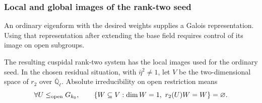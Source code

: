 \subsubsection{Local and global images of the rank-two seed}

An ordinary eigenform with the desired weights supplies a Galois representation. Using that representation after extending the base field requires control of its image on open subgroups.

\begin{proposition}\label{prop:mixed-hilbert-restriction}
The resulting cuspidal rank-two system has the local images used
for the ordinary seed. In the chosen residual situation, with
\(\bar\eta^2\ne1\), let \(V\) be the two-dimensional space of \(r_2\) over \(\overline{\mathbb Q}_\ell\). Absolute irreducibility on open restriction means 
\[
 \forall U\le_{\rm open}G_{k_0},\qquad \{W\subseteq V:\dim W=1,\ r_2(U)W=W\}=\varnothing.
\]

\end{proposition}

